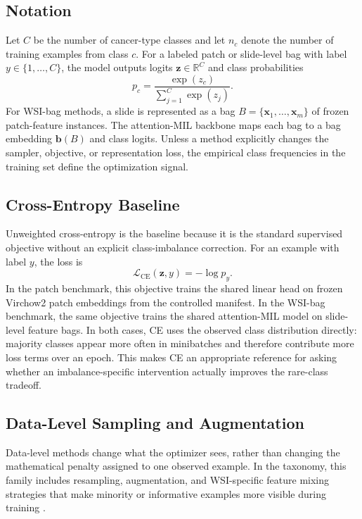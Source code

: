 \documentclass[11pt]{article}
\begin{document}
\subsection{Notation}
Let $C$ be the number of cancer-type classes and let $n_c$ denote the number of training examples from class $c$. For a labeled patch or slide-level bag with label $y\in\{1,\ldots,C\}$, the model outputs logits $\mathbf{z}\in\mathbb{R}^{C}$ and class probabilities
\begin{equation}
  p_c = \frac{\exp(z_c)}{\sum_{j=1}^{C}\exp(z_j)}.
  \label{eq:softmax}
\end{equation}
For WSI-bag methods, a slide is represented as a bag $B=\{\mathbf{x}_1,\ldots,\mathbf{x}_m\}$ of frozen patch-feature instances. The attention-MIL backbone maps each bag to a bag embedding $\mathbf{b}(B)$ and class logits. Unless a method explicitly changes the sampler, objective, or representation loss, the empirical class frequencies in the training set define the optimization signal.

\subsection{Cross-Entropy Baseline}
Unweighted cross-entropy is the baseline because it is the standard supervised objective without an explicit class-imbalance correction. For an example with label $y$, the loss is
\begin{equation}
  \mathcal{L}_{\mathrm{CE}}(\mathbf{z},y) = -\log p_y.
  \label{eq:ce}
\end{equation}
In the patch benchmark, this objective trains the shared linear head on frozen Virchow2 patch embeddings from the controlled manifest. In the WSI-bag benchmark, the same objective trains the shared attention-MIL model on slide-level feature bags. In both cases, CE uses the observed class distribution directly: majority classes appear more often in minibatches and therefore contribute more loss terms over an epoch. This makes CE an appropriate reference for asking whether an imbalance-specific intervention actually improves the rare-class tradeoff.

\subsection{Data-Level Sampling and Augmentation}
Data-level methods change what the optimizer sees, rather than changing the mathematical penalty assigned to one observed example. In the taxonomy, this family includes resampling, augmentation, and WSI-specific feature mixing strategies that make minority or informative examples more visible during training \citep{saini2023tacklingClass}.
\end{document}
